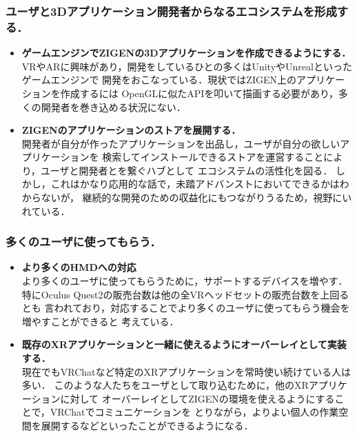 \subsubsection*{ユーザと3Dアプリケーション開発者からなるエコシステムを形成する．}

\begin{itemize}
  \item \textbf{ゲームエンジンでZIGENの3Dアプリケーションを作成できるようにする．}\\
        VRやARに興味があり，開発をしているひとの多くはUnityやUnrealといったゲームエンジンで
        開発をおこなっている．現状ではZIGEN上のアプリケーションを作成するには
        OpenGLに似たAPIを叩いて描画する必要があり，多くの開発者を巻き込める状況にない．

  \item \textbf{ZIGENのアプリケーションのストアを展開する．}\\
        開発者が自分が作ったアプリケーションを出品し，ユーザが自分の欲しいアプリケーションを
        検索してインストールできるストアを運営することにより，ユーザと開発者とを繋ぐハブとして
        エコシステムの活性化を図る．
        しかし，これはかなり応用的な話で，未踏アドバンストにおいてできるかはわからないが，
        継続的な開発のための収益化にもつながりうるため，視野にいれている．
\end{itemize}

\subsubsection*{多くのユーザに使ってもらう．}

\begin{itemize}
  \item \textbf{より多くのHMDへの対応}\\
        より多くのユーザに使ってもらうために，サポートするデバイスを増やす．
        特にOculus Quest2の販売台数は他の全VRヘッドセットの販売台数を上回るとも
        言われており，対応することでより多くのユーザに使ってもらう機会を増やすことができると
        考えている．

  \item \textbf{既存のXRアプリケーションと一緒に使えるようにオーバーレイとして実装する．}\\
        現在でもVRChatなど特定のXRアプリケーションを常時使い続けている人は多い．
        このような人たちをユーザとして取り込むために，他のXRアプリケーションに対して
        オーバーレイとしてZIGENの環境を使えるようにすることで，VRChatでコミュニケーションを
        とりながら，よりよい個人の作業空間を展開するなどといったことができるようになる．
\end{itemize}

